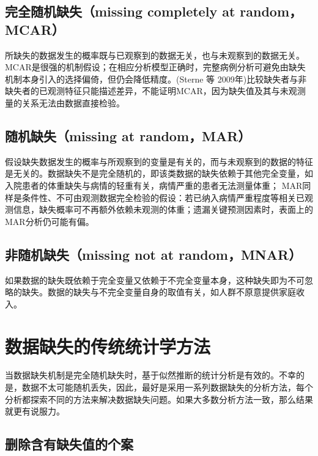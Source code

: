 \documentclass[
  chinese-hans,
  letterpaper,
  DIV=11,
  numbers=noendperiod]{scrreprt}
\begin{document}
\subsection{完全随机缺失（missing completely at
random，MCAR）}\label{ux5b8cux5168ux968fux673aux7f3aux5931missing-completely-at-randommcar}

所缺失的数据发生的概率既与已观察到的数据无关，也与未观察到的数据无关。MCAR是很强的机制假设；在相应分析模型正确时，完整病例分析可避免由缺失机制本身引入的选择偏倚，但仍会降低精度。(Sterne
等
2009年)比较缺失者与非缺失者的已观测特征只能描述差异，不能证明MCAR，因为缺失值及其与未观测量的关系无法由数据直接检验。

\subsection{随机缺失（missing at
random，MAR）}\label{ux968fux673aux7f3aux5931missing-at-randommar}

假设缺失数据发生的概率与所观察到的变量是有关的，而与未观察到的数据的特征是无关的。数据缺失不是完全随机的，即该类数据的缺失依赖于其他完全变量，如入院患者的体重缺失与病情的轻重有关，病情严重的患者无法测量体重；
MAR同样是条件性、不可由观测数据完全检验的假设：若已纳入病情严重程度等相关已观测信息，缺失概率可不再额外依赖未观测的体重；遗漏关键预测因素时，表面上的MAR分析仍可能有偏。

\subsection{非随机缺失（missing not at
random，MNAR）}\label{ux975eux968fux673aux7f3aux5931missing-not-at-randommnar}

如果数据的缺失既依赖于完全变量又依赖于不完全变量本身，这种缺失即为不可忽略的缺失。数据的缺失与不完全变量自身的取值有关，如人群不原意提供家庭收入。

\section{数据缺失的传统统计学方法}\label{ux6570ux636eux7f3aux5931ux7684ux4f20ux7edfux7edfux8ba1ux5b66ux65b9ux6cd5}

当数据缺失机制是完全随机缺失时，基于似然推断的统计分析是有效的。不幸的是，数据不太可能随机丢失，因此，最好是采用一系列数据缺失的分析方法，每个分析都探索不同的方法来解决数据缺失问题。如果大多数分析方法一致，那么结果就更有说服力。

\subsection{删除含有缺失值的个案}\label{ux5220ux9664ux542bux6709ux7f3aux5931ux503cux7684ux4e2aux6848}
\end{document}
